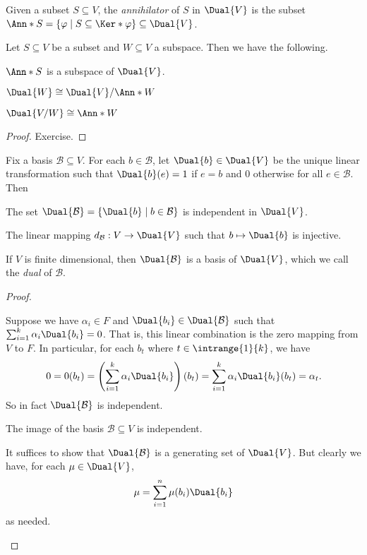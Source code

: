 \documentclass{memoir}
\begin{document}
\begin{dfn}
Given a subset $S \subseteq V$, the \emph{annihilator} of $S$ in $\Dual{V}$ is the subset $\Ann*{S} = \{ \varphi \mid S \subseteq \Ker*{\varphi} \} \subseteq \Dual{V}$.
\end{dfn}

\begin{prp}
Let $S \subseteq V$ be a subset and $W \subseteq V$ a subspace. Then we have the following.

\begin{inparaenum}
\item $\Ann*{S}$ is a subspace of $\Dual{V}$. \hfill
\item $\Dual{W} \cong \Dual{V}/\Ann*{W}$ \hfill
\item $\Dual{V/W} \cong \Ann*{W}$
\end{inparaenum}
\end{prp}

\begin{proof} \mbox{}
Exercise.
\end{proof}

\begin{prp}
Fix a basis $\mathcal{B} \subseteq V$. For each $b \in \mathcal{B}$, let $\Dual{b} \in \Dual{V}$ be the unique linear transformation such that $\Dual{b}(e) = 1$ if $e = b$ and $0$ otherwise for all $e \in \mathcal{B}$. Then
\begin{enumerate*}
\item The set $\Dual{\mathcal{B}} = \{\Dual{b} \mid b \in \mathcal{B}\}$ is independent in $\Dual{V}$.
\item The linear mapping $d_\mathcal{B} : V \rightarrow \Dual{V}$ such that $b \mapsto \Dual{b}$ is injective.
\item If $V$ is finite dimensional, then $\Dual{\mathcal{B}}$ is a basis of $\Dual{V}$, which we call the \emph{dual} of $\mathcal{B}$.
\end{enumerate*}
\end{prp}

\begin{proof} \mbox{}
\begin{enumerate*}
\item Suppose we have $\alpha_i \in F$ and $\Dual{b_i} \in \Dual{\mathcal{B}}$ such that $\sum_{i=1}^k \alpha_i \Dual{b_i} = 0$. That is, this linear combination is the zero mapping from $V$ to $F$. In particular, for each $b_t$ where $t \in \intrange{1}{k}$, we have \[ 0 = 0(b_t) = \left(\sum_{i=1}^k \alpha_i \Dual{b_i}\right)(b_t) = \sum_{i=1}^k \alpha_i \Dual{b_i}(b_t) = \alpha_t. \] So in fact $\Dual{\mathcal{B}}$ is independent.
\item The image of the basis $\mathcal{B} \subseteq V$ is independent.
\item It suffices to show that $\Dual{\mathcal{B}}$ is a generating set of $\Dual{V}$. But clearly we have, for each $\mu \in \Dual{V}$, \[ \mu = \sum_{i=1}^n \mu(b_i) \Dual{b_i} \] as needed. \qedhere
\end{enumerate*}
\end{proof}
\end{document}
